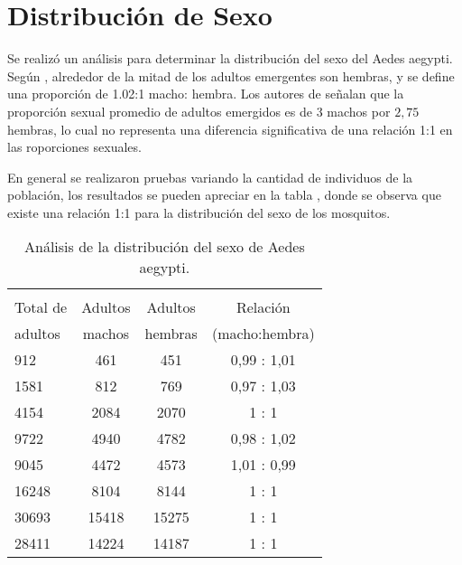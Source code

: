 \section{Distribución de Sexo}
Se realizó un análisis para determinar la distribución del sexo del Aedes aegypti. Según
\cite{otero2006stochastic}, alrededor de la mitad de los adultos emergentes son hembras, y se
define una proporción de 1.02:1 macho: hembra. Los autores de \cite{manrique1998desarrollo}
señalan que la proporción sexual promedio de adultos emergidos es de $3$ machos por $2,75$
hembras, lo cual no representa una diferencia significativa de una relación 1:1 en las roporciones
sexuales.

En general se realizaron pruebas variando la cantidad de individuos de la población, los
resultados se pueden apreciar en la tabla , donde se observa que
existe una relación 1:1 para la distribución del sexo de los mosquitos.

\begin{table}
    \centering
        \caption{ \label{tab:distribucion-sexo-test} Análisis de la distribución del sexo de Aedes
        aegypti.}
        \begin{tabular}{l c c c }
            \hline \\
            Total de & Adultos & Adultos & Relación \\
            adultos  & machos  & hembras & (macho:hembra) \\
            \hline
            \hline
            912    &  461    &  451    &  0,99 : 1,01 \\
            1581   &  812    &  769    &  0,97 : 1,03 \\
            4154   &  2084   &  2070   &  1    : 1 \\
            9722   &  4940   &  4782   &  0,98 : 1,02 \\
            9045   &  4472   &  4573   &  1,01 : 0,99 \\
            16248  &  8104   &  8144   &  1    : 1 \\
            30693  &  15418  &  15275  &  1    : 1 \\
            28411  &  14224  &  14187  &  1    : 1 \\
        \end{tabular}
\end{table}
